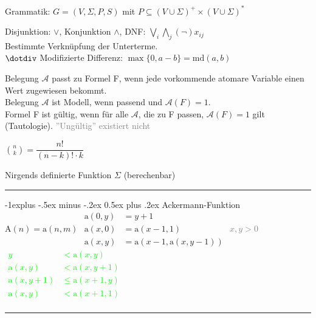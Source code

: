 \documentclass[a4paper,10pt,landscape]{article}
\makeatletter
\renewcommand{\subsection}{\@startsection{subsection}{2}{0mm}%
                                {-1explus -.5ex minus -.2ex}%
                                {0.5ex plus .2ex}%
                                {\normalfont\normalsize\bfseries}}
\makeatother
\begin{document}
\begin{multicols}{3}
    \vspace{3pt}
    Grammatik: $G=(V,\Sigma, P,S)$ mit $P\subseteq(V\cup\Sigma)^+ \times (V\cup\Sigma)^*$

    \vspace{3pt}
    Disjunktion: $\lor$, Konjunktion $\land$,
    DNF: $ \bigvee_i \bigwedge_j (\neg)x_{ij} $\\
    Bestimmte Verknüpfung der Unterterme.\\

    $\dotdiv$ Modifizierte Differenz: $ \max\{0,a-b\}=\textrm{md}(a,b)$

    Belegung $\mathscr{A}$ passt zu Formel F, wenn jede vorkommende atomare Variable einen Wert zugewiesen bekommt.\\
    Belegung $\mathscr{A}$ ist Modell, wenn passend und $\mathscr{A}(F) = 1$.\\
    Formel F ist gültig, wenn für alle $\mathscr{A}$, die zu F passen, $\mathscr{A}(F) = 1$ gilt (Tautologie).
    \textcolor{gray}{''Ungültig'' existiert nicht}

    $\binom{n}{k} = \dfrac{n!}{(n-k)! \cdot k}$

    Nirgends definierte Funktion $\Sigma$ (berechenbar)

    \hrule
    \smallskip

    \subsection{Ackermann-Funktion $\textrm{A}(n)= \textrm{a}(n,m)$}
    \arraycolsep=1.4pt
    $\begin{array}{ll}
    \textrm{a}(0,y) &= y+1 \\
    \textrm{a}(x,0) &= \textrm{a}(x-1,1)\\
    \textrm{a}(x,y) &= \textrm{a}(x-1,\textrm{a}(x,y-1))
    \end{array}$
    \textcolor{gray}{$x,y>0$}\\
    \vspace{2pt}
    \textcolor{lime}{
    $\begin{array}{ll}
    y &< \textrm{a}(x,y) \\
    \textrm{a}(x,y) &< \textrm{a}(x,y+1) \\
    \textrm{a}(x,y+1) &\leq \textrm{a}(x+1,y) \\
    \textrm{a}(x,y) &< \textrm{a}(x+1,1)\\
    \end{array}
    $}
    \hrule
    \smallskip


\end{multicols}
\end{document}
